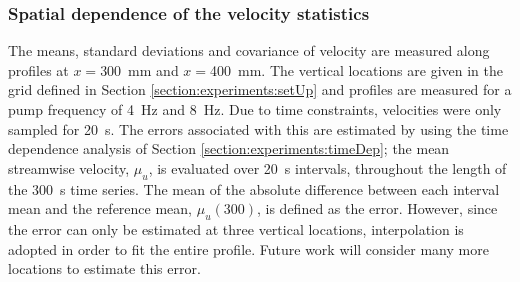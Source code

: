 \documentclass[12pt,oneside,a4paper]{article}
\begin{document}
\subsubsection{Spatial dependence of the velocity statistics}
\label{section:experiments:profiles}
The means, standard deviations and covariance of velocity are measured along profiles at $x=$\SI{300}{mm} and $x=$\SI{400}{mm}. The vertical locations are given in the grid defined in Section \ref{section:experiments:setUp} and profiles are measured for a pump frequency of \SI{4}{Hz} and \SI{8}{Hz}. Due to time constraints, velocities were only sampled for \SI{20}{s}. The errors associated with this are estimated by using the time dependence analysis of Section \ref{section:experiments:timeDep}; the mean streamwise velocity, $\mu_u$, is evaluated over \SI{20}{s} intervals, throughout the length of the \SI{300}{s} time series. The mean of the absolute difference between each interval mean and the reference mean, $\mu_u(300)$, is defined as the error. However, since the error can only be estimated at three vertical locations, interpolation is adopted in order to fit the entire profile. Future work will consider many more locations to estimate this error. 
\end{document}
